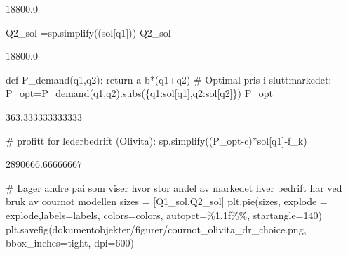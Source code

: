 \documentclass[
  12pt,
  a4paper,
  DIV=11,
  numbers=noendperiod]{scrartcl}
\newenvironment{Shaded}{\begin{snugshade}}{\end{snugshade}}
\newcommand{\CommentTok}[1]{\textcolor[rgb]{0.37,0.37,0.37}{#1}}
\newcommand{\ControlFlowTok}[1]{\textcolor[rgb]{0.00,0.23,0.31}{#1}}
\newcommand{\DecValTok}[1]{\textcolor[rgb]{0.68,0.00,0.00}{#1}}
\newcommand{\KeywordTok}[1]{\textcolor[rgb]{0.00,0.23,0.31}{#1}}
\newcommand{\NormalTok}[1]{\textcolor[rgb]{0.00,0.23,0.31}{#1}}
\newcommand{\OperatorTok}[1]{\textcolor[rgb]{0.37,0.37,0.37}{#1}}
\newcommand{\SpecialCharTok}[1]{\textcolor[rgb]{0.37,0.37,0.37}{#1}}
\newcommand{\StringTok}[1]{\textcolor[rgb]{0.13,0.47,0.30}{#1}}
\begin{document}
$\displaystyle 18800.0$

\begin{Shaded}
\begin{Highlighting}[]
\NormalTok{Q2\_sol }\OperatorTok{=}\NormalTok{sp.simplify((sol[q1]))}
\NormalTok{Q2\_sol}
\end{Highlighting}
\end{Shaded}

$\displaystyle 18800.0$

\begin{Shaded}
\begin{Highlighting}[]
\KeywordTok{def}\NormalTok{ P\_demand(q1,q2):}
    \ControlFlowTok{return}\NormalTok{ a}\OperatorTok{{-}}\NormalTok{b}\OperatorTok{*}\NormalTok{(q1}\OperatorTok{+}\NormalTok{q2)}
\CommentTok{\# Optimal pris i sluttmarkedet:}
\NormalTok{P\_opt}\OperatorTok{=}\NormalTok{P\_demand(q1,q2).subs(\{q1:sol[q1],q2:sol[q2]\})}
\NormalTok{P\_opt}
\end{Highlighting}
\end{Shaded}

$\displaystyle 363.333333333333$

\begin{Shaded}
\begin{Highlighting}[]
\CommentTok{\# profitt for lederbedrift (Olivita):}
\NormalTok{sp.simplify((P\_opt}\OperatorTok{{-}}\NormalTok{c)}\OperatorTok{*}\NormalTok{sol[q1]}\OperatorTok{{-}}\NormalTok{f\_k)}
\end{Highlighting}
\end{Shaded}

$\displaystyle 2890666.66666667$

\begin{Shaded}
\begin{Highlighting}[]
\CommentTok{\# Lager andre pai som viser hvor stor andel av markedet hver bedrift har ved bruk av cournot modellen}
\NormalTok{sizes }\OperatorTok{=}\NormalTok{ [Q1\_sol,Q2\_sol]}
\NormalTok{plt.pie(sizes, explode }\OperatorTok{=}\NormalTok{ explode,labels}\OperatorTok{=}\NormalTok{labels, colors}\OperatorTok{=}\NormalTok{colors, autopct}\OperatorTok{=}\StringTok{\textquotesingle{}}\SpecialCharTok{\%1.1f\%\%}\StringTok{\textquotesingle{}}\NormalTok{, startangle}\OperatorTok{=}\DecValTok{140}\NormalTok{)}
\NormalTok{plt.savefig(}\StringTok{\textquotesingle{}dokumentobjekter/figurer/cournot\_olivita\_dr\_choice.png\textquotesingle{}}\NormalTok{, bbox\_inches}\OperatorTok{=}\StringTok{\textquotesingle{}tight\textquotesingle{}}\NormalTok{, dpi}\OperatorTok{=}\DecValTok{600}\NormalTok{)}
\end{Highlighting}
\end{Shaded}
\end{document}
